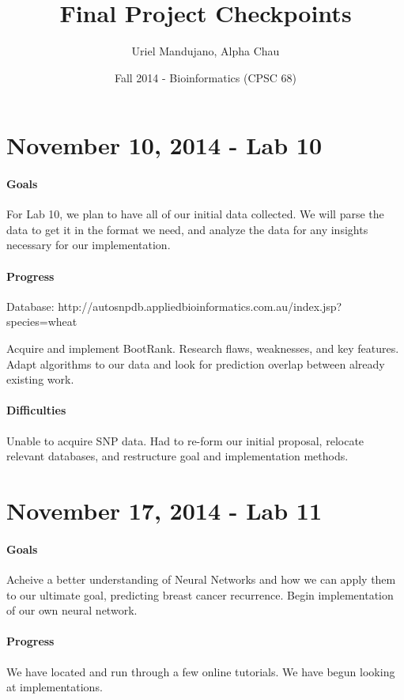 \documentclass[11pt]{article}
\title{Final Project  Checkpoints}
\author{Uriel Mandujano, Alpha Chau}
\date{Fall 2014 - Bioinformatics (CPSC 68)}
\begin{document}
\maketitle

\section{November 10, 2014 - Lab 10}

\paragraph{Goals} For Lab 10, we plan to have all of our initial data collected.  We will parse the data to get it in the format we need, and analyze the data for any insights necessary for our implementation.

\paragraph{Progress}
Database: 
http://autosnpdb.appliedbioinformatics.com.au/index.jsp?
species=wheat

Acquire and implement BootRank. Research flaws, weaknesses, and key 
features. Adapt algorithms to our data and look for prediction overlap 
between already existing work.
    
  
\paragraph{Difficulties} Unable to acquire SNP data. Had to re-form our initial proposal, relocate relevant databases, and restructure goal and implementation methods. 


\section{November 17, 2014 - Lab 11}

\paragraph{Goals} Acheive a better understanding of Neural Networks and how we can apply them to our ultimate goal, predicting breast cancer recurrence. Begin implementation of our own neural network.

\paragraph{Progress} We have located and run through a few online tutorials. We have begun looking at implementations.
\end{document}
